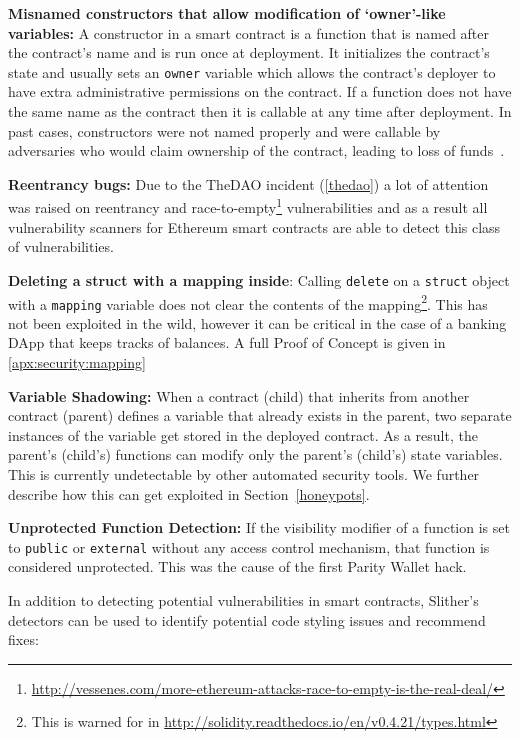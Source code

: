 \textbf{Misnamed constructors that allow modification of `owner'-like variables:} A constructor in a smart contract is a function that is named after the contract's name and is run once at deployment. It initializes the contract's state and usually sets an \texttt{owner} variable which allows the contract's deployer to have extra administrative permissions on the contract. If a function does not have the same name as the contract then it is callable at any time after deployment. In past cases, constructors were not named properly and were callable by adversaries who would claim ownership of the contract, leading to loss of funds~\cite{Atzei:2017:SAE:3080353.3080363}.

\textbf{Reentrancy bugs:} Due to the TheDAO incident (\ref{thedao}) a lot of attention was raised on reentrancy and race-to-empty\footnote{\url{http://vessenes.com/more-ethereum-attacks-race-to-empty-is-the-real-deal/}} vulnerabilities and as a result all vulnerability scanners for Ethereum smart contracts are able to detect this class of vulnerabilities.

\textbf{Deleting a struct with a mapping inside}: Calling \texttt{delete} on a \texttt{struct} object with a \texttt{mapping} variable does not clear the contents of the mapping\footnote{This is warned for in \url{http://solidity.readthedocs.io/en/v0.4.21/types.html}}. This has not been exploited in the wild, however it can be critical in the case of a banking DApp that keeps tracks of balances. A full Proof of Concept is given in \ref{apx:security:mapping}

\textbf{Variable Shadowing:} When a contract (child) that inherits from another contract (parent) defines a variable that already exists in the parent, two separate instances of the variable get stored in the deployed contract. As a result, the parent's (child's) functions can modify only the parent's (child's) state variables. This is currently undetectable by other automated security tools. We further describe how this can get exploited in Section~\ref{honeypots}.

\textbf{Unprotected Function Detection:} If the visibility modifier of a function is set to \texttt{public} or \texttt{external} without any access control mechanism, that function is considered unprotected. This was the cause of the first Parity Wallet hack.

In addition to detecting potential vulnerabilities in smart contracts, Slither's detectors can be used to identify potential code styling issues and recommend fixes:

